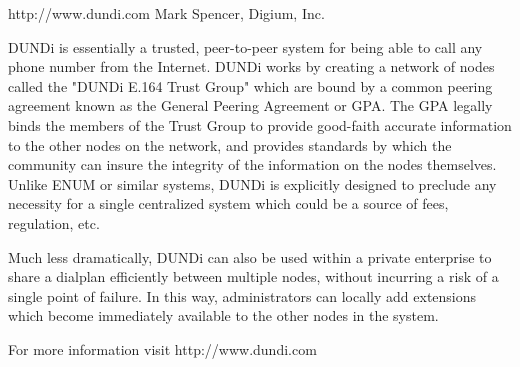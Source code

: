 http://www.dundi.com
Mark Spencer, Digium, Inc.

DUNDi is essentially a trusted, peer-to-peer system for being able to
call any phone number from the Internet.  DUNDi works by creating a
network of nodes called the "DUNDi E.164 Trust Group" which are bound by
a common peering agreement known as the General Peering Agreement or
GPA.  The GPA legally binds the members of the Trust Group to provide
good-faith accurate information to the other nodes on the network, and
provides standards by which the community can insure the integrity of
the information on the nodes themselves.  Unlike ENUM or similar
systems, DUNDi is explicitly designed to preclude any necessity for a
single centralized system which could be a source of fees, regulation,
etc.

Much less dramatically, DUNDi can also be used within a private
enterprise to share a dialplan efficiently between multiple nodes,
without incurring a risk of a single point of failure.  In this way,
administrators can locally add extensions which become immediately
available to the other nodes in the system.

For more information visit http://www.dundi.com
